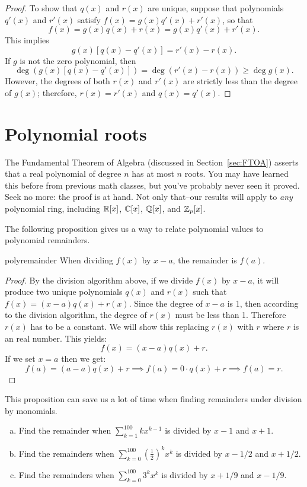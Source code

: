 \begin{proof}
To show that  $q(x)$ and $r(x)$ are unique, suppose that polynomials $q'(x)$ and $r'(x)$ satisfy $f(x) = g(x) q'(x)
+ r'(x)$, so that
\[
f(x) = g(x) q(x) + r(x) = g(x) q'(x) + r'(x).
\]
This implies
\[
g(x) [q(x) - q'(x) ] = r'(x) - r(x).
\]
If $g$ is not the zero polynomial, then 
\[
\deg( g(x) [q(x) - q'(x) ] )= \deg( r'(x) - r(x) ) \geq \deg g(x).
\]
However, the degrees of both $r(x)$ and $r'(x)$ are strictly less than
the degree of $g(x)$; therefore, $r(x) = r'(x)$ and $q(x) = q'(x)$.
\end{proof}

\section{Polynomial roots}
The Fundamental Theorem of Algebra (discussed in Section~\ref{sec:FTOA}) asserts that a real polynomial of degree $n$ has at most $n$ roots. You may have learned this before from previous math classes, but you've probably never seen it proved. Seek no more: the proof is at hand. Not only that--our results will apply to  \emph{any} polynomial ring, including $\mathbb{R}[x]$, $\mathbb{C}[x]$, $\mathbb{Q}[x]$, and $\mathbb{Z}_p[x]$.  

The following proposition gives us a way to relate polynomial values to polynomial remainders.

\begin {prop}{polyremainder}
When dividing $f(x)$ by $x-a$, the remainder is $f(a)$.
\end {prop}

\begin {proof}
By the division algorithm above, if we divide $f(x)$ by $x-a$, it will produce two unique polynomials $q(x)$ and $r(x)$ such that $f(x) = (x-a)q(x) + r(x)$.  Since the degree of $x-a$ is 1, then according to the division algorithm, the degree of $r(x)$ must be less than 1.  Therefore $r(x)$ has to be a constant.  We will show this replacing $r(x)$ with $r$ where $r$ is an real number.  This yields:
\[f(x) = (x-a)q(x) + r.\]
If we set $x=a$ then we get:
\[f(a) = (a-a)q(x) + r \implies f(a) = 0 \cdot q(x) + r \implies f(a) = r.\]
\end {proof}

This proposition can save us a lot of time when finding remainders under division by monomials.

\begin{exercise}
\begin{enumerate}[(a)]
\item
Find the remainder when $\sum_{k=1}^{100} k x^{k-1}$ is divided by $x-1$ and  $x+1$.
\item
Find the remainders when $\sum_{k=0}^{100} \left( \frac{1}{2} \right)^k x^k$ is divided by $x-1/2$ and $x+1/2$.
\item
Find the remainders when $\sum_{k=0}^{100} 3^k x^{k}$ is divided by $x+1/9$ and $x - 1/9$.
\end{enumerate}
\end{exercise}

